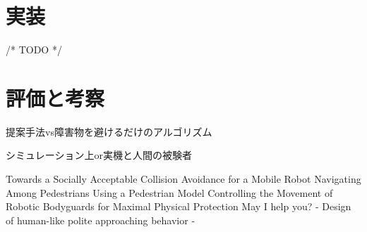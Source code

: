 \documentclass[twocolumn]{jsarticle}
\begin{document}


\section{実装}

/* TODO */

\section{評価と考察}
提案手法vs障害物を避けるだけのアルゴリズム

シミュレーション上or実機と人間の被験者


\begin{thebibliography}{3}
 Towards a Socially Acceptable Collision Avoidance for a Mobile Robot Navigating Among Pedestrians Using a Pedestrian Model
 Controlling the Movement of Robotic Bodyguards for Maximal Physical Protection
 May I help you? - Design of human-like polite approaching behavior -
\end{thebibliography}
\end{document}
